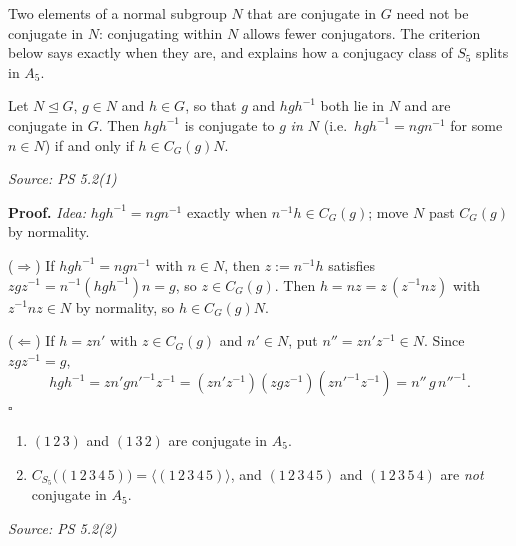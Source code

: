 \documentclass[11pt]{report}
\renewenvironment{proof}[1][Proof]{\noindent\textbf{#1.} }{\hfill$\square$\par\vspace{5pt}}
\newcommand{\srcline}[1]{\par\hfill{\footnotesize\textit{Source: #1}}}
\begin{document}
Two elements of a normal subgroup $N$ that are conjugate in $G$ need not be conjugate in $N$: conjugating within $N$ allows fewer conjugators. The criterion below says exactly when they are, and explains how a conjugacy class of $S_5$ splits in $A_5$.

\begin{propbox}\label{prop:conjugacy-normal-subgroup}
Let $N \trianglelefteq G$, $g \in N$ and $h \in G$, so that $g$ and $hgh^{-1}$ both lie in $N$ and are conjugate in $G$. Then $hgh^{-1}$ is conjugate to $g$ \emph{in $N$} (i.e.\ $hgh^{-1} = ngn^{-1}$ for some $n \in N$) if and only if $h \in C_G(g)N$.
\srcline{PS 5.2(1)}
\end{propbox}

\begin{proof}
\textit{Idea:} $hgh^{-1} = ngn^{-1}$ exactly when $n^{-1}h \in C_G(g)$; move $N$ past $C_G(g)$ by normality.\par
($\Rightarrow$) If $hgh^{-1} = ngn^{-1}$ with $n \in N$, then $z := n^{-1}h$ satisfies $zgz^{-1} = n^{-1}(hgh^{-1})n = g$, so $z \in C_G(g)$. Then $h = nz = z\,(z^{-1}nz)$ with $z^{-1}nz \in N$ by normality, so $h \in C_G(g)N$.

($\Leftarrow$) If $h = zn'$ with $z \in C_G(g)$ and $n' \in N$, put $n'' = zn'z^{-1} \in N$. Since $zgz^{-1} = g$,
\[ hgh^{-1} = zn'gn'^{-1}z^{-1} = (zn'z^{-1})(zgz^{-1})(zn'^{-1}z^{-1}) = n''\,g\,n''^{-1}. \]
\end{proof}

\begin{propbox}\label{prop:two-pairs-a5}
\begin{enumerate}
    \item $(1\,2\,3)$ and $(1\,3\,2)$ are conjugate in $A_5$.
    \item $C_{S_5}\big((1\,2\,3\,4\,5)\big) = \langle (1\,2\,3\,4\,5) \rangle$, and $(1\,2\,3\,4\,5)$ and $(1\,2\,3\,5\,4)$ are \emph{not} conjugate in $A_5$.
\end{enumerate}
\srcline{PS 5.2(2)}
\end{propbox}
\end{document}
